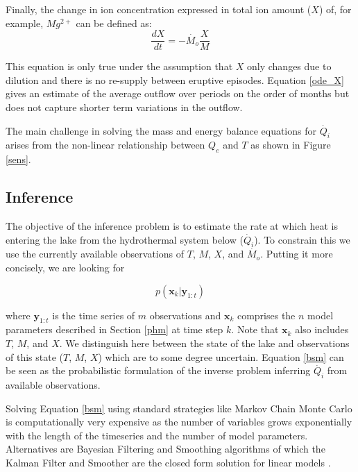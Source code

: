\documentclass[doublespacing, linenumbers]{bmcart}
\newcommand{\bm}[1]{{\textbf{#1}}}
\begin{document}
Finally, the change in ion concentration expressed in total ion amount ($X$) of,
for example, $Mg^{2+}$ can be defined as:
\begin{equation}\label{ode_X}
	\frac{dX}{dt}=-\dot{M_o}\frac{X}{M}
\end{equation}

This equation is only true under the assumption that $X$ only changes due to
dilution and there is no re-supply between eruptive episodes. Equation
\ref{ode_X} gives an estimate of the average outflow over periods on the order
of months but does not capture shorter term variations in the outflow.

The main challenge in solving the mass and energy balance equations for
$\dot{Q_i}$ arises from the non-linear relationship between $Q_e$ and ${T}$
as shown in Figure \ref{sens}.

\subsection{Inference}\label{inf}

The objective of the inference problem is to estimate the rate at which heat
is entering the lake from the hydrothermal system below ($\dot{Q_i}$).
To constrain this we use the currently available observations of $T$, $M$,
$X$, and $\dot{M_o}$. Putting it more concisely, we are looking for 

\begin{equation}\label{bsm}
    p(\bm{x}_k|\bm{y}_{1:t})
\end{equation}

where $\bm{y}_{1:t}$ is the time series of $m$ observations and $\bm{x}_k$ comprises
the $n$ model parameters described in Section \ref{phm} at time step $k$. Note
that $\bm{x}_k$ also includes $T$, $M$, and $X$. We distinguish here between the
state of the lake and observations of this state ($T$, $M$, $X$) which are to
some degree uncertain. Equation \ref{bsm} can be seen as the probabilistic
formulation of the inverse problem inferring $\dot{Q_i}$ from available
observations.  

Solving Equation \ref{bsm} using standard strategies like Markov Chain Monte
Carlo is computationally very expensive as the number of variables grows
exponentially with the length of the timeseries and the number of model
parameters. Alternatives are Bayesian Filtering and Smoothing algorithms of
which the Kalman Filter and Smoother are the closed form solution for linear
models \cite{Kalman1960, Rauch1965, sarkkaBayesianFilteringSmoothing2013}.
\end{document}
